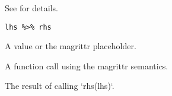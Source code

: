 \documentclass[a4paper]{book}
\begin{document}
%
\begin{Description}
See  for details.
\end{Description}
%
\begin{Usage}
\begin{verbatim}
lhs %>% rhs
\end{verbatim}
\end{Usage}
%
\begin{Arguments}
\begin{ldescription}
\item[\code{lhs}] A value or the magrittr placeholder.

\item[\code{rhs}] A function call using the magrittr semantics.
\end{ldescription}
\end{Arguments}
%
\begin{Value}
The result of calling `rhs(lhs)`.
\end{Value}
\printindex{}
\end{document}
